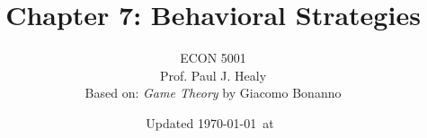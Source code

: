 

\title[Behavioral Strategies]{Chapter 7: Behavioral Strategies}
\author[ECON 5001]{ECON 5001\\Prof. Paul J. Healy\\Based on: \textit{Game Theory} by Giacomo Bonanno} \color{metrop}
\institute[OSU]{}
\date[]{\vfill {\tiny Updated \today\ at\ \DTMcurrenttime}}

%
